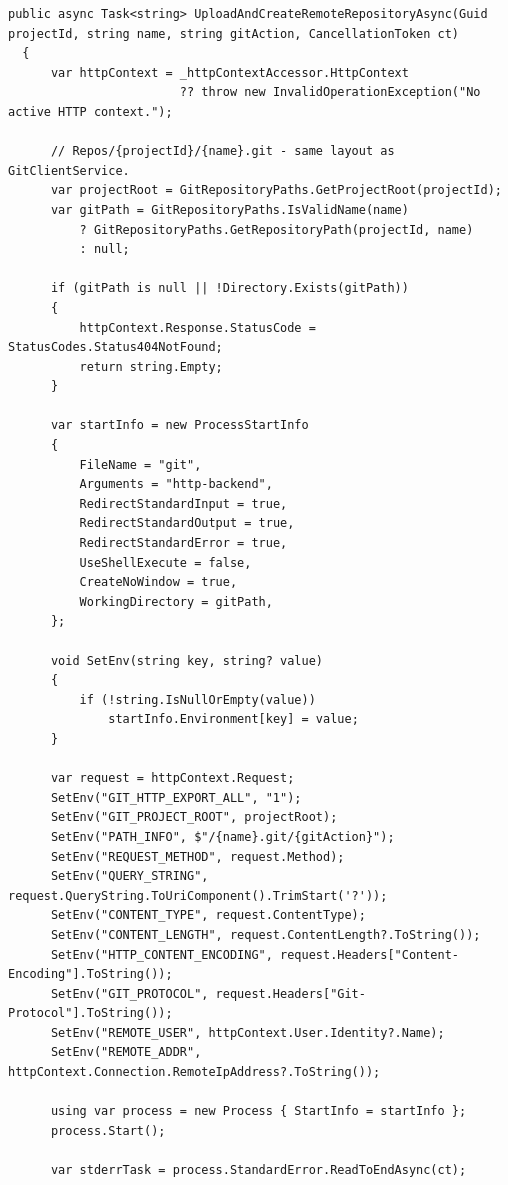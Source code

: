 \begin{lstlisting}[basicstyle=\footnotesize\ttfamily, captionpos=t, caption={Obsługa żadania \textit{push} lub \textit{pull}}, label={lst:obsługa_żądania_git}]
public async Task<string> UploadAndCreateRemoteRepositoryAsync(Guid projectId, string name, string gitAction, CancellationToken ct)
  {
      var httpContext = _httpContextAccessor.HttpContext
                        ?? throw new InvalidOperationException("No active HTTP context.");

      // Repos/{projectId}/{name}.git - same layout as GitClientService.
      var projectRoot = GitRepositoryPaths.GetProjectRoot(projectId);
      var gitPath = GitRepositoryPaths.IsValidName(name)
          ? GitRepositoryPaths.GetRepositoryPath(projectId, name)
          : null;

      if (gitPath is null || !Directory.Exists(gitPath))
      {
          httpContext.Response.StatusCode = StatusCodes.Status404NotFound;
          return string.Empty;
      }

      var startInfo = new ProcessStartInfo
      {
          FileName = "git",
          Arguments = "http-backend",
          RedirectStandardInput = true,
          RedirectStandardOutput = true,
          RedirectStandardError = true,
          UseShellExecute = false,
          CreateNoWindow = true,
          WorkingDirectory = gitPath,
      };

      void SetEnv(string key, string? value)
      {
          if (!string.IsNullOrEmpty(value))
              startInfo.Environment[key] = value;
      }

      var request = httpContext.Request;
      SetEnv("GIT_HTTP_EXPORT_ALL", "1");
      SetEnv("GIT_PROJECT_ROOT", projectRoot);
      SetEnv("PATH_INFO", $"/{name}.git/{gitAction}");
      SetEnv("REQUEST_METHOD", request.Method);
      SetEnv("QUERY_STRING", request.QueryString.ToUriComponent().TrimStart('?'));
      SetEnv("CONTENT_TYPE", request.ContentType);
      SetEnv("CONTENT_LENGTH", request.ContentLength?.ToString());
      SetEnv("HTTP_CONTENT_ENCODING", request.Headers["Content-Encoding"].ToString());
      SetEnv("GIT_PROTOCOL", request.Headers["Git-Protocol"].ToString());
      SetEnv("REMOTE_USER", httpContext.User.Identity?.Name);
      SetEnv("REMOTE_ADDR", httpContext.Connection.RemoteIpAddress?.ToString());

      using var process = new Process { StartInfo = startInfo };
      process.Start();

      var stderrTask = process.StandardError.ReadToEndAsync(ct);


\end{lstlisting}
